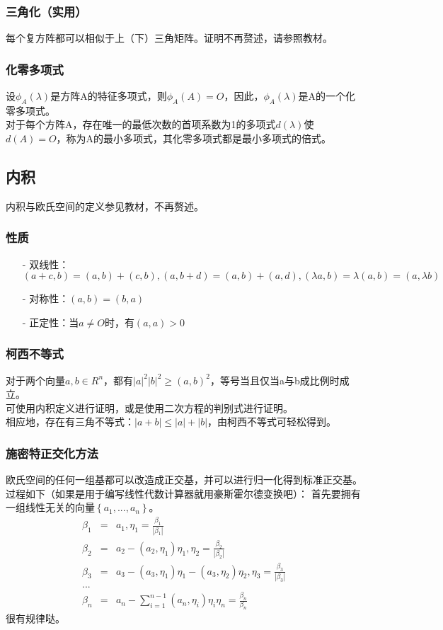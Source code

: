 \documentclass[UTF8]{ctexart}
\begin{document}
	      \subsubsection{三角化（实用）}
          每个复方阵都可以相似于上（下）三角矩阵。证明不再赘述，请参照教材。
          \subsubsection{化零多项式}
          设$\phi_{A}(\lambda)$是方阵A的特征多项式，则$\phi_{A}(A)=\mathit{O}$，因此，$\phi_{A}(\lambda)$是A的一个化零多项式。\\
          \indent
          对于每个方阵A，存在唯一的最低次数的首项系数为1的多项式$d(\lambda)$使$d(A)=\mathit{O}$，称为A的最小多项式，其化零多项式都是最小多项式的倍式。
\subsection{内积}
内积与欧氏空间的定义参见教材，不再赘述。
\subsubsection{性质}
\begin{itemize}
\item[-]双线性：$(a+c,b)=(a,b)+(c,b),(a,b+d)=(a,b)+(a,d),(\lambda a,b)=\lambda(a,b)=(a,\lambda b)$
\item[-]对称性：$(a,b)=(b,a)$
\item[-]正定性：当$a\neq \mathit{O}$时，有$(a,a)>0$
\end{itemize}
\subsubsection{柯西不等式}
对于两个向量$a,b\in R^{n}$，都有$|a|^{2}|b|^{2}\geq(a,b)^{2}$，等号当且仅当a与b成比例时成立。\\
\indent
可使用内积定义进行证明，或是使用二次方程的判别式进行证明。\\
\indent
相应地，存在有三角不等式：$|a+b|\leq|a|+|b|$，由柯西不等式可轻松得到。
\subsubsection{施密特正交化方法}
欧氏空间的任何一组基都可以改造成正交基，并可以进行归一化得到标准正交基。
过程如下（如果是用于编写线性代数计算器就用豪斯霍尔德变换吧）：
首先要拥有一组线性无关的向量$\left\{a_1,...,a_n\right\}$。
\begin{eqnarray*}
    \beta_{1}&=&a_1, \eta_{1}  = \frac{\beta_{1}}{|\beta_{1}|} \\
    \beta_{2}&=&a_2-(a_2,\eta_1)\eta_1, \eta_2=\frac{\beta_{2}}{|\beta_{2}|}\\
    \beta_{3}&=&a_3-(a_3,\eta_1)\eta_1-(a_3,\eta_2)\eta_2, \eta_3 = \frac{\beta_{3}}{|\beta_{3}|}\\
    ...\\
    \displaystyle \beta_{n}&=&a_n-\sum^{n-1}_{i=1}(a_n,\eta_i)\eta_i \eta_n= \frac{\beta_{n}}{\beta_{n}}
\end{eqnarray*}
很有规律哒。
\end{document}

